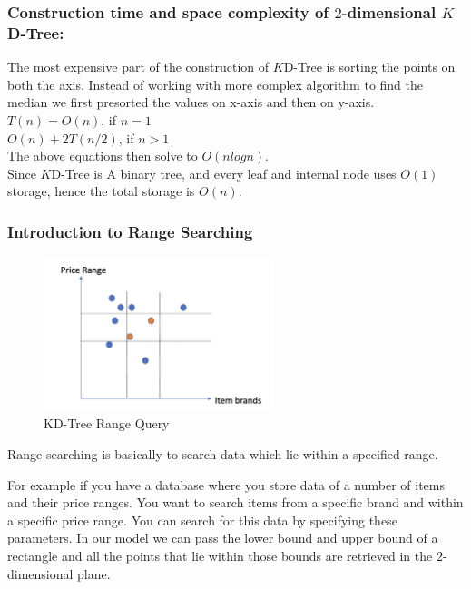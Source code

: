 \subsubsection{Construction time and space complexity of $2$-dimensional $K$D-Tree:}

The most expensive part of the construction of $K$D-Tree is sorting the points on both the axis. Instead of working with more complex algorithm to find the median we first presorted the values on x-axis and then on y-axis.\\
$T(n) = O(n)$, if $n = 1$\\
$O(n) + 2T(n/2)$, if $n > 1$\\
The above equations then solve to $O( n log n)$.\\

Since $K$D-Tree is A binary tree, and every leaf and internal node uses $O(1)$ storage, hence the total storage is $O(n)$.


\subsubsection{Introduction to Range Searching}

\begin{figure}[htp]
    \centering
    \includegraphics[width=0.6\textwidth]{graphs/Range_Query_Intro.png}
    \caption{KD-Tree Range Query}
    \label{fig:KD_ee_Range_Query_Intro}
\end{figure}

Range searching is basically to search data which lie within a specified range. 

\begin{mscexample}
    For example if you have a database where you store data of a number of items and their price ranges. You want to search items from a specific brand and within a specific price range. You can search for this data by specifying these parameters. In our model we can pass the lower bound and upper bound of a rectangle and all the points that lie within those bounds are retrieved in the $2$-dimensional plane.
\end{mscexample}

